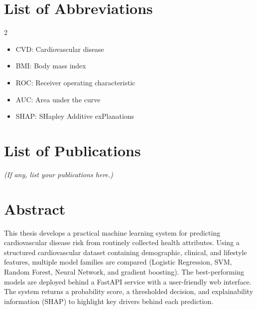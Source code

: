 \documentclass[12pt, a4paper, oneside]{book}
\begin{document}
\chapter*{List of Abbreviations}
\begin{multicols}{2}
\begin{itemize}
\item CVD: Cardiovascular disease
\item BMI: Body mass index
\item ROC: Receiver operating characteristic
\item AUC: Area under the curve
\item SHAP: SHapley Additive exPlanations
\end{itemize}
\end{multicols}

\chapter*{List of Publications}
\emph{(If any, list your publications here.)}

\chapter*{Abstract}
This thesis develops a practical machine learning system for predicting cardiovascular disease risk from routinely collected health attributes. Using a structured cardiovascular dataset containing demographic, clinical, and lifestyle features, multiple model families are compared (Logistic Regression, SVM, Random Forest, Neural Network, and gradient boosting). The best-performing models are deployed behind a FastAPI service with a user-friendly web interface. The system returns a probability score, a thresholded decision, and explainability information (SHAP) to highlight key drivers behind each prediction.

\mainmatter
{}



\backmatter

\end{document}
